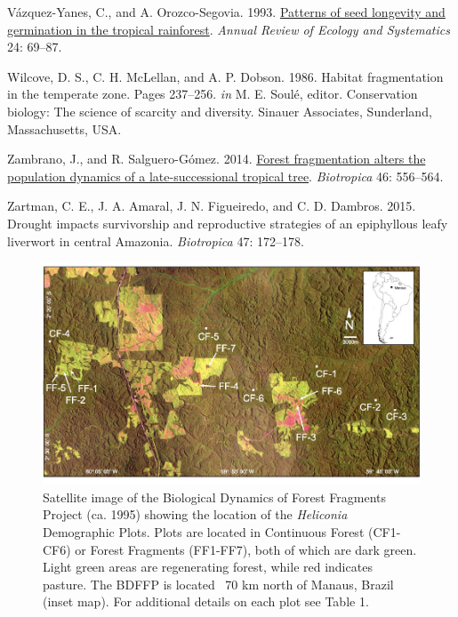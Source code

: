 \documentclass[
  12pt,
  man, donotrepeattitle,floatsintext]{apa6}
\newlength{\cslhangindent}
\newlength{\cslentryspacingunit} %
\newenvironment{CSLReferences}[2] %
 {%
  \setlength{\parindent}{0pt}
  \ifodd #1
  \let\oldpar\par
  \def\par{\hangindent=\cslhangindent\oldpar}
  \fi
  \setlength{\parskip}{#2\cslentryspacingunit}
 }%
 {}
\begin{document}
\begin{CSLReferences}{1}{0}
\leavevmode{}%
Vázquez-Yanes, C., and A. Orozco-Segovia. 1993. \href{https://doi.org/10.1146/annurev.es.24.110193.000441}{Patterns of seed longevity and germination in the tropical rainforest}. \emph{Annual Review of Ecology and Systematics} 24: 69--87.

\leavevmode{}%
Wilcove, D. S., C. H. McLellan, and A. P. Dobson. 1986. Habitat fragmentation in the temperate zone. Pages 237--256. \emph{in} M. E. Soulé, editor. Conservation biology: {The} science of scarcity and diversity. Sinauer Associates, Sunderland, Massachusetts, USA.

\leavevmode{}%
Zambrano, J., and R. Salguero-Gómez. 2014. \href{https://doi.org/10.1111/btp.12144}{Forest fragmentation alters the population dynamics of a late-successional tropical tree}. \emph{Biotropica} 46: 556--564.

\leavevmode{}%
Zartman, C. E., J. A. Amaral, J. N. Figueiredo, and C. D. Dambros. 2015. Drought impacts survivorship and reproductive strategies of an epiphyllous leafy liverwort in central {Amazonia}. \emph{Biotropica} 47: 172--178.

\end{CSLReferences}

\endgroup

\newpage
\begin{figure}[h]
\includegraphics[width=1\linewidth]{Bruna_etal_MetadataS1_files/figure-latex/map-1} \caption{Satellite image of the Biological Dynamics of Forest Fragments Project (ca. 1995) showing the location of the \textit{Heliconia} Demographic Plots. Plots are located in Continuous Forest (CF1-CF6) or Forest Fragments (FF1-FF7), both of which are dark green. Light green areas are regenerating forest, while red indicates pasture. The BDFFP is located ~70 km north of Manaus, Brazil (inset map). For additional details on each plot see Table 1.}\label{fig:map}
\end{figure}
\end{document}
